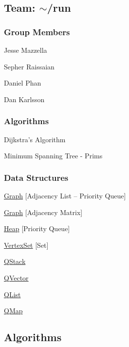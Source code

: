 \subsection*{Team\+: $\sim$/run}

\subsubsection*{Group Members}


\begin{DoxyItemize}
\item Jesse Mazzella
\item Sepher Raissaian
\item Daniel Phan
\item Dan Karlsson
\end{DoxyItemize}

\subsubsection*{Algorithms}


\begin{DoxyItemize}
\item Dijkstra’s Algorithm
\item Minimum Spanning Tree -\/ Prims
\end{DoxyItemize}

\subsubsection*{Data Structures}


\begin{DoxyItemize}
\item \hyperlink{class_graph}{Graph} \mbox{[}Adjacency List – Priority Queue\mbox{]}
\item \hyperlink{class_graph}{Graph} \mbox{[}Adjacency Matrix\mbox{]}
\item \hyperlink{class_heap}{Heap} \mbox{[}Priority Queue\mbox{]}
\item \hyperlink{class_vertex_set}{Vertex\+Set} \mbox{[}Set\mbox{]}
\item \hyperlink{class_q_stack}{Q\+Stack}
\item \hyperlink{class_q_vector}{Q\+Vector}
\item \hyperlink{class_q_list}{Q\+List}
\item \hyperlink{class_q_map}{Q\+Map}
\end{DoxyItemize}

\subsection*{Algorithms}

